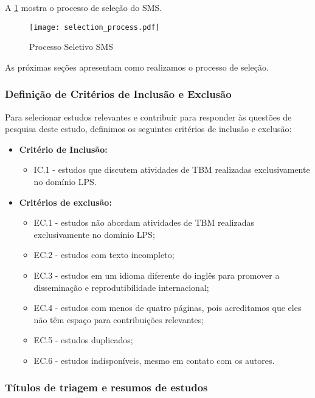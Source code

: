 A \ref{fig:selection_process} mostra o processo de seleção do SMS.

\begin{figure} [!ht]
	\centering
	\texttt{[image: selection\_process.pdf]}
	\caption{Processo Seletivo SMS}
	\label{fig:selection_process}
\end{figure}

As próximas seções apresentam como realizamos o processo de seleção.

\subsubsection{Definição de Critérios de Inclusão e Exclusão}
\label{sec:criteria}

Para selecionar estudos relevantes e contribuir para responder às questões de pesquisa deste estudo, definimos os seguintes critérios de inclusão e exclusão:

\begin{itemize}
	\item \textbf{Critério de Inclusão:}
	\begin{itemize}
		\item IC.1 - estudos que discutem atividades de TBM realizadas exclusivamente no domínio LPS.
	\end{itemize}
	
	\item \textbf{Critérios de exclusão:}
	\begin{itemize}
		\item EC.1 - estudos não abordam atividades de TBM realizadas exclusivamente no domínio LPS;
		\item EC.2 - estudos com texto incompleto;
		\item EC.3 - estudos em um idioma diferente do inglês para promover a disseminação e reprodutibilidade internacional;
		\item EC.4 - estudos com menos de quatro páginas, pois acreditamos que eles não têm espaço para contribuições relevantes;
		\item EC.5 - estudos duplicados;
		\item EC.6 - estudos indisponíveis, mesmo em contato com os autores.
	\end{itemize}
\end{itemize}

\subsubsection{Títulos de triagem e resumos de estudos}

